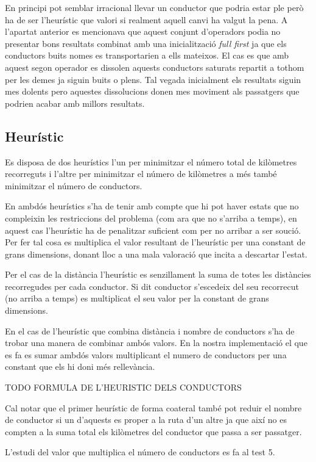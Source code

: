 En principi pot semblar irracional llevar un conductor que podria estar ple però ha de ser l'heurístic
que valori si realment aquell canvi ha valgut la pena.
A l'apartat anterior es mencionava que aquest conjunt d'operadors podia no presentar bons resultats
combinat amb una inicialització \emph{full first} ja que els conductors buits nomes es transportarien
a ells mateixos. El cas es que amb aquest segon operador es dissolen aquests conductors saturats
repartit a tothom per les demes ja siguin buits o plens. Tal vegada inicialment els resultats siguin
mes dolents pero aquestes dissolucions donen mes moviment als passatgers que podrien acabar amb millors
resultats.


\subsection{Heurístic}
Es disposa de dos heurístics l'un per minimitzar el número total de kilòmetres recorreguts i l'altre per
minimitzar el número de kilòmetres a més també minimitzar el número de conductors.

En ambdós heurístics s'ha de tenir amb compte que hi pot haver estats que no compleixin les restriccions del problema
(com ara que no s'arriba a temps), en aquest cas l'heurístic ha de penalitzar suficient com per no arribar a ser so\lgem ució.
Per fer tal cosa es multiplica el valor resultant de l'heurístic per una constant de grans
dimensions, donant lloc a una mala valoració que incita a descartar l'estat.

Per el cas de la distància l'heurístic es senzillament la suma de totes les distàncies recorregudes per cada conductor.
Si dit conductor s'escedeix del seu recorrecut (no arriba a temps) es multiplicat el seu valor per la constant de grans dimensions.

En el cas de l'heurístic que combina distància i nombre de conductors s'ha de trobar una manera de combinar ambós valors.
En la nostra implementació el que es fa es sumar ambdós valors multiplicant el numero de conductors per una constant que els hi
doni més rellevància.

TODO FORMULA DE L'HEURISTIC DELS CONDUCTORS

Cal notar que el primer heurístic de forma co\lgem ateral també pot reduir el nombre de conductor si un d'aquests es proper
a la ruta d'un altre ja que així no es compten a la suma total els kilòmetres del conductor que passa a ser passatger.

L'estudi del valor que multiplica el número de conductors es fa al test 5.
